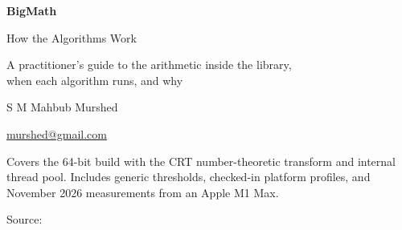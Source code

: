 \documentclass[11pt,a4paper,oneside]{report}
\makeatletter
\newcommand{\guideauthor}{S M Mahbub Murshed}
\newcommand{\guideauthoremail}{murshed@gmail.com}
\makeatother
\begin{document}
\hypersetup{pageanchor=false}
\begin{titlepage}
  \centering
  \vspace*{3cm}
  {\Huge\bfseries BigMath\par}
  \vspace{0.6cm}
  {\LARGE How the Algorithms Work\par}
  \vspace{0.4cm}
  {\large A practitioner's guide to the arithmetic inside the library,\\
  when each algorithm runs, and why\par}
  \vspace{0.8cm}
  {\large \guideauthor\par}
  \smallskip
  {\small \href{mailto:\guideauthoremail}{\guideauthoremail}\par}
  \vspace{2cm}
  \vfill
  {\small Covers the 64-bit build with the CRT number-theoretic transform and internal
  thread pool. Includes generic thresholds, checked-in platform profiles, and
  November 2026 measurements from an Apple M1 Max.\par}
  \vspace{0.5cm}
  {\small Source: \par}
\end{titlepage}
\hypersetup{pageanchor=true}

\tableofcontents

















\appendix

\end{document}
